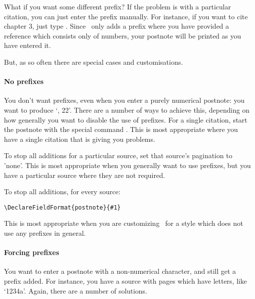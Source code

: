 What if you want some different prefix? If the problem is with a
particular citation, you can just enter the prefix manually. For
instance, if you want to cite chapter 3, just type
. Since \biblatex\ only adds a
prefix where you have provided a reference which consists only of
numbers, your postnote will be printed as you have entered it.

 But, as so often there are special
cases and customisations.

\paragraph{No prefixes} You don't want prefixes, even when you enter a
purely numerical postnote: you want  to produce
`, 22'. There are a number of ways to achieve this,
depending on how generally you want to disable the use of prefixes.
For a single citation, start the postnote with the special command
.   This is most appropriate where you have a
single citation that is giving you problems.

To stop all additions
for a particular source, set that source’s pagination to ’none’. This
is most appropriate when you generally want to use prefixes, but you
have a particular source where they are not required.

To stop all additions, for every source:
\begin{center}
\verb|\DeclareFieldFormat{postnote}{#1}|
\end{center}
This is most appropriate when you are customizing \biblatex\ for a
style which does not use any prefixes in general.

\paragraph{Forcing prefixes} You want to enter a postnote with a
non-numerical character, and still get a prefix added. For instance,
you have a source with pages which have letters, like `1234a'. Again,
there are a number of solutions.

